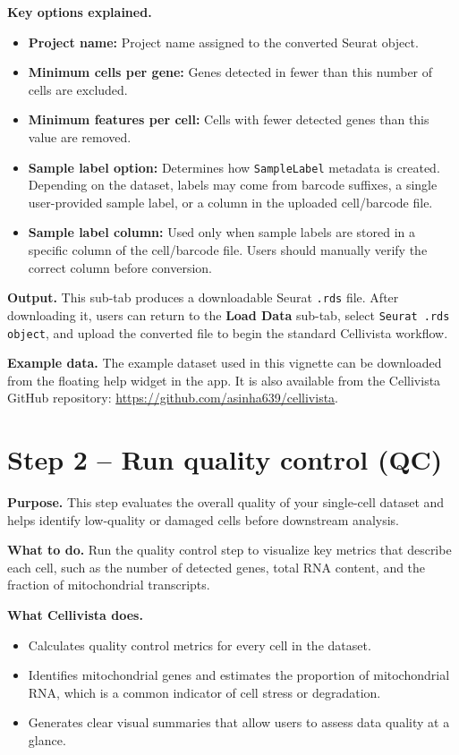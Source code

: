 \documentclass[11pt]{article}
\begin{document}
\textbf{Key options explained.}
\begin{itemize}
  \item \textbf{Project name:} Project name assigned to the converted Seurat object.
  \item \textbf{Minimum cells per gene:} Genes detected in fewer than this number of cells are excluded.
  \item \textbf{Minimum features per cell:} Cells with fewer detected genes than this value are removed.
  \item \textbf{Sample label option:} Determines how \texttt{SampleLabel} metadata is created. Depending on the dataset, labels may come from barcode suffixes, a single user-provided sample label, or a column in the uploaded cell/barcode file.
  \item \textbf{Sample label column:} Used only when sample labels are stored in a specific column of the cell/barcode file. Users should manually verify the correct column before conversion.
\end{itemize}

\textbf{Output.}
This sub-tab produces a downloadable Seurat \texttt{.rds} file. After downloading it, users can return to the \textbf{Load Data} sub-tab, select \texttt{Seurat .rds object}, and upload the converted file to begin the standard Cellivista workflow.

\textbf{Example data.}
The example dataset used in this vignette can be downloaded from the floating help widget in the app. It is also available from the Cellivista GitHub repository: \url{https://github.com/asinha639/cellivista}.

\section{Step 2 -- Run quality control (QC)}

\textbf{Purpose.}  
This step evaluates the overall quality of your single-cell dataset and helps identify low-quality or damaged cells before downstream analysis.

\textbf{What to do.}  
Run the quality control step to visualize key metrics that describe each cell, such as the number of detected genes, total RNA content, and the fraction of mitochondrial transcripts.

\textbf{What Cellivista does.}
\begin{itemize}[leftmargin=*,nosep]
\item Calculates quality control metrics for every cell in the dataset.
\item Identifies mitochondrial genes and estimates the proportion of mitochondrial RNA, which is a common indicator of cell stress or degradation.
\item Generates clear visual summaries that allow users to assess data quality at a glance.
\end{itemize}
\end{document}
